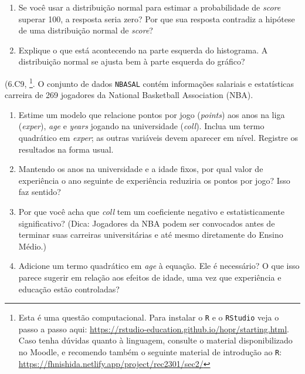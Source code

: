 \documentclass[12pt,letterpaper, onecolumn]{exam}
\begin{document}
\begin{questions}
		\begin{enumerate}[label=(\roman*)]
			\item Se você usar a distribuição normal para estimar a probabilidade de \textit{score} superar 100, a resposta seria zero? Por que sua resposta contradiz a hipótese de uma distribuição normal de \textit{score}?
			
			\item Explique o que está acontecendo na parte esquerda do histograma. A distribuição normal se ajusta bem à parte esquerda do gráfico?
		\end{enumerate}
		
		\question\qstar (6.C9, \citep{wooldridge2016}\footnote{Esta é uma questão computacional. Para instalar o \texttt{R} e o \texttt{RStudio} veja o passo a passo aqui: \href{https://rstudio-education.github.io/hopr/starting.html}{https://rstudio-education.github.io/hopr/starting.html}. Caso tenha dúvidas quanto à linguagem, consulte o material disponibilizado no Moodle, e recomendo também o seguinte material de introdução ao \texttt{R}: \href{https://fhnishida.netlify.app/project/rec2301/sec2/}{https://fhnishida.netlify.app/project/rec2301/sec2/} }. O conjunto de dados \texttt{NBASAL} contém informações salariais e estatísticas carreira de 269 jogadores da National Basketball Association (NBA).
		
		\begin{enumerate}[label=(\roman*)]
			\item Estime um modelo que relacione pontos por jogo (\textit{points}) aos anos na liga (\textit{exper}), \textit{age} e \textit{years} jogando na universidade (\textit{coll}). Inclua um termo quadrático em \textit{exper}; as outras variáveis devem aparecer em nível. Registre os resultados na forma usual.
			
			\item Mantendo os anos na universidade e a idade fixos, por qual valor de experiência o ano seguinte de experiência reduziria os pontos por jogo? Isso faz sentido?
			
			\item Por que você acha que \textit{coll} tem um coeficiente negativo e estatisticamente significativo? (Dica: Jogadores da NBA podem ser convocados antes de terminar suas carreiras universitárias e até mesmo diretamente do Ensino Médio.)
			
			\item Adicione um termo quadrático em \textit{age} à equação. Ele é necessário? O que isso parece sugerir em relação aos efeitos de idade, uma vez que experiência e educação estão controladas?
			

\end{enumerate}
\end{questions}
\end{document}
